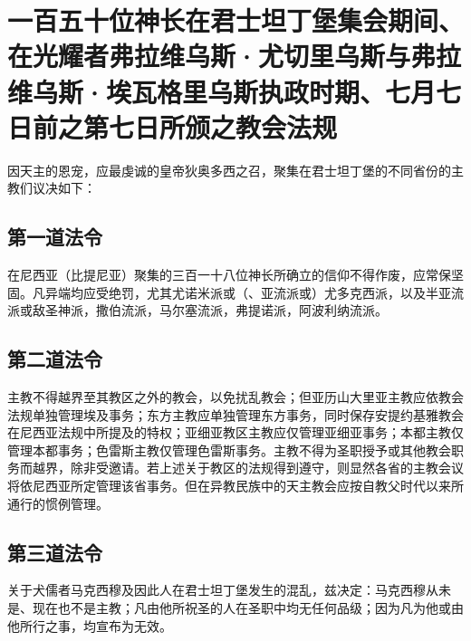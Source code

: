 
\section{一百五十位神长在君士坦丁堡集会期间、在光耀者弗拉维乌斯·尤切里乌斯与弗拉维乌斯·埃瓦格里乌斯执政时期、七月七日前之第七日所颁之教会法规}

因天主的恩宠，应最虔诚的皇帝狄奥多西之召，聚集在君士坦丁堡的不同省份的主教们议决如下：\par


\subsection{第一道法令}

在尼西亚（比提尼亚）聚集的三百一十八位神长所确立的信仰不得作废，应常保坚固。凡异端均应受绝罚，尤其尤诺米派或（、亚流派或）尤多克西派，以及半亚流派或敌圣神派，撒伯流派，马尔塞流派，弗提诺派，阿波利纳流派。\par


\subsection{第二道法令}

主教不得越界至其教区之外的教会，以免扰乱教会；但亚历山大里亚主教应依教会法规单独管理埃及事务；东方主教应单独管理东方事务，同时保存安提约基雅教会在尼西亚法规中所提及的特权；亚细亚教区主教应仅管理亚细亚事务；本都主教仅管理本都事务；色雷斯主教仅管理色雷斯事务。主教不得为圣职授予或其他教会职务而越界，除非受邀请。若上述关于教区的法规得到遵守，则显然各省的主教会议将依尼西亚所定管理该省事务。但在异教民族中的天主教会应按自教父时代以来所通行的惯例管理。\par


\subsection{第三道法令}

关于犬儒者马克西穆及因此人在君士坦丁堡发生的混乱，兹决定：马克西穆从未是、现在也不是主教；凡由他所祝圣的人在圣职中均无任何品级；因为凡为他或由他所行之事，均宣布为无效。\par

